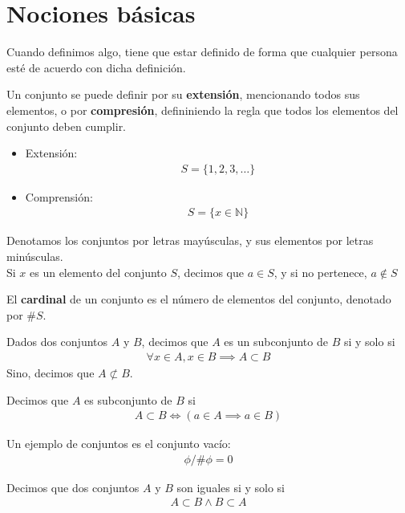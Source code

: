 \documentclass{../Topologia.tex}
\begin{document}
\section{Nociones básicas}
Cuando definimos algo, tiene que estar definido de forma que cualquier persona
esté de acuerdo con dicha definición.
\begin{defin}
	Un conjunto se puede definir por su \textbf{extensión}, mencionando todos
	sus elementos, o por \textbf{compresión}, defininiendo la regla que todos
	los elementos del conjunto deben cumplir.
	\begin{itemize}
		\item Extensión:\\
			\begin{equation}
				\begin{split}
					S = \{ 1,2,3,\dots  \}
				\end{split}
			\end{equation}
		\item Comprensión:\\
			\begin{equation}
				\begin{split}
					S = \{ x \in \mathbb{N} \}
				\end{split}
			\end{equation}
	\end{itemize}
	Denotamos los conjuntos por letras mayúsculas, y sus elementos por letras
	minúsculas.\\
	Si $x$ es un elemento del conjunto $S$, decimos que $a \in S$, y si no
	pertenece, $a \notin S$
\end{defin}
\begin{defin}
	El \textbf{cardinal} de un conjunto es el número de elementos del conjunto,
	denotado por $\#S$. 
\end{defin}
Dados dos conjuntos $A$ y $B$, decimos que $A$ es un subconjunto de $B$ si y solo
si
\begin{equation}
	\begin{split}
		\forall x \in A, x \in B \implies A \subset B
	\end{split}
\end{equation}
Sino, decimos que $A \not\subset B$.
\begin{defin}
	Decimos que $A$ es subconjunto de $B$ si
	\begin{equation}
		\begin{split}
			A \subset B \iff (a \in A \implies a \in B)
		\end{split}
	\end{equation}
\end{defin}
Un ejemplo de conjuntos es el conjunto vacío:
\begin{equation}
	\begin{split}
		\phi / \# \phi = 0
	\end{split}
\end{equation}
\begin{defin}
	Decimos que dos conjuntos $A$ y $B$ son iguales si y solo si
	\begin{equation}
		\begin{split}
			A \subset B \wedge B \subset A
		\end{split}
	\end{equation}
\end{defin}
\end{document}
